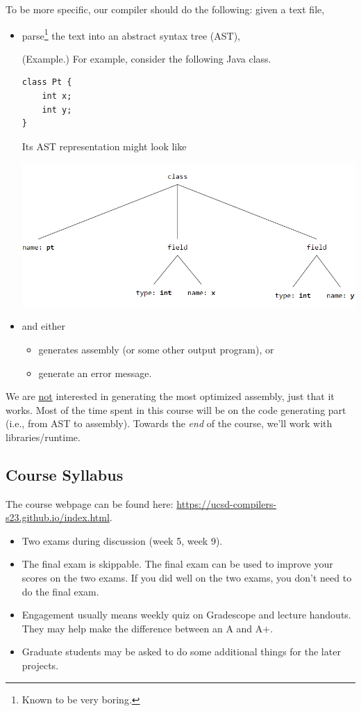 \documentclass[letterpaper]{article}
\begin{document}
To be more specific, our compiler should do the following: given a  text file, 
\begin{itemize}
    \item parse\footnote{Known to be very boring.} the text into an abstract syntax tree (AST), 
    \begin{mdframed}
        (Example.) For example, consider the following Java class. 
\begin{verbatim}
class Pt {
    int x; 
    int y; 
}\end{verbatim}
        Its AST representation might look like 
        \begin{center}
            \includegraphics[scale=0.8]{../assets/ast.png}
        \end{center}
    \end{mdframed}
    \item and either 
    \begin{itemize}
        \item generates assembly (or some other output program), or 
        \item generate an error message.
    \end{itemize}
\end{itemize}
We are \underline{not} interested in generating the most optimized assembly, just that it works. Most of the time spent in this course will be on the code generating part (i.e., from AST to assembly). Towards the \emph{end} of the course, we'll work with libraries/runtime.

\subsection{Course Syllabus}
The course webpage can be found here: \href{https://ucsd-compilers-s23.github.io/index.html}{https://ucsd-compilers-s23.github.io/index.html}. 
\begin{itemize}
    \item Two exams during discussion (week 5, week 9).
    \item The final exam is skippable. The final exam can be used to improve your scores on the two exams. If you did well on the two exams, you don't need to do the final exam. 
    \item Engagement usually means weekly quiz on Gradescope and lecture handouts. They may help make the difference between an A and A+.
    \item Graduate students may be asked to do some additional things for the later projects.
\end{itemize}
\end{document}
